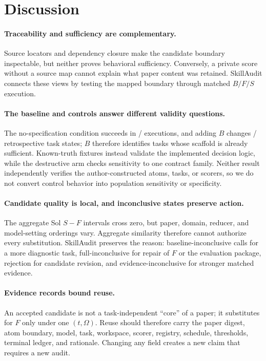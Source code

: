 \section{Discussion}

\paragraph{Traceability and sufficiency are complementary.}
Source locators and dependency closure make the candidate boundary inspectable, but neither proves behavioral sufficiency. Conversely, a private score without a source map cannot explain what paper content was retained. SkillAudit connects these views by testing the mapped boundary through matched $B/F/S$ execution.

\paragraph{The baseline and controls answer different validity questions.}
The no-specification condition succeeds in \PrimaryBSuccess{}/\PrimaryRowsPerCondition{} executions, and adding $B$ changes \AblationBChangedTasks{}/\PrimaryTasks{} retrospective task states; $B$ therefore identifies tasks whose scaffold is already sufficient. Known-truth fixtures instead validate the implemented decision logic, while the destructive arm checks sensitivity to one contract family. Neither result independently verifies the author-constructed atoms, tasks, or scorers, so we do not convert control behavior into population sensitivity or specificity.

\paragraph{Candidate quality is local, and inconclusive states preserve action.}
The aggregate Sol $S-F$ intervals cross zero, but paper, domain, reducer, and model-setting orderings vary. Aggregate similarity therefore cannot authorize every substitution. SkillAudit preserves the reason: baseline-inconclusive calls for a more diagnostic task, full-inconclusive for repair of $F$ or the evaluation package, rejection for candidate revision, and evidence-inconclusive for stronger matched evidence.

\paragraph{Evidence records bound reuse.}
An accepted candidate is not a task-independent ``core'' of a paper; it substitutes for $F$ only under one $(t,\Omega)$. Reuse should therefore carry the paper digest, atom boundary, model, task, workspace, scorer, registry, schedule, thresholds, terminal ledger, and rationale. Changing any field creates a new claim that requires a new audit.

